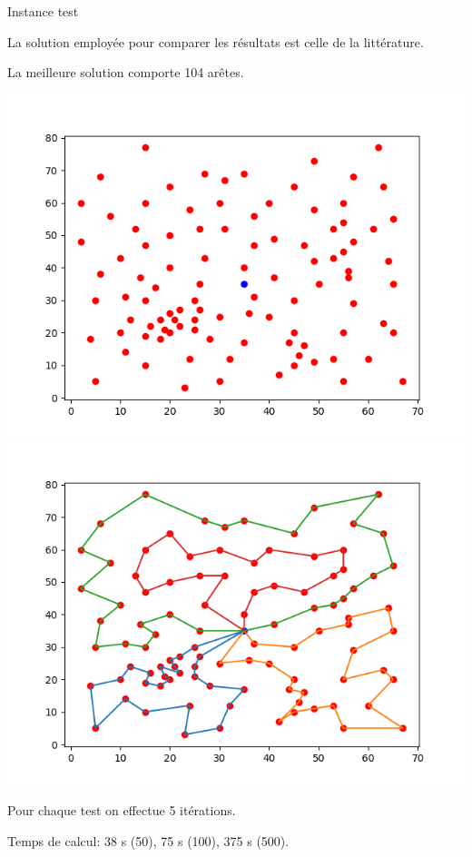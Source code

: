 \documentclass{beamer}
\begin{document}
\begin{frame}{Instance test}

La solution employée pour comparer les résultats est celle de la littérature.

La meilleure solution comporte 104 arêtes.

\includegraphics[scale=0.3]{Instance10104.png}
\includegraphics[scale=0.3]{Solution10104.png}

Pour chaque test on effectue 5 itérations.

Temps de calcul: 38 s (50), 75 s (100), 375 s (500). 
\end{frame}
\end{document}
